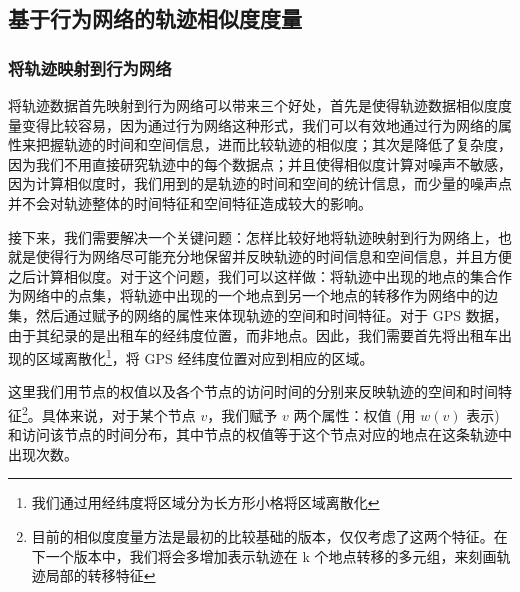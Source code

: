 \subsection{基于行为网络的轨迹相似度度量}
\subsubsection{将轨迹映射到行为网络}
\label{subsubsec:mapping}
将轨迹数据首先映射到行为网络可以带来三个好处，首先是使得轨迹数据相似度度量变得比较容易，因为通过行为网络这种形式，我们可以有效地通过行为网络的属性来把握轨迹的时间和空间信息，进而比较轨迹的相似度；其次是降低了复杂度，因为我们不用直接研究轨迹中的每个数据点；并且使得相似度计算对噪声不敏感，因为计算相似度时，我们用到的是轨迹的时间和空间的统计信息，而少量的噪声点并不会对轨迹整体的时间特征和空间特征造成较大的影响。\par
接下来，我们需要解决一个关键问题：怎样比较好地将轨迹映射到行为网络上，也就是使得行为网络尽可能充分地保留并反映轨迹的时间信息和空间信息，并且方便之后计算相似度。对于这个问题，我们可以这样做：将轨迹中出现的地点的集合作为网络中的点集，将轨迹中出现的一个地点到另一个地点的转移作为网络中的边集，然后通过赋予的网络的属性来体现轨迹的空间和时间特征。对于 GPS 数据，由于其纪录的是出租车的经纬度位置，而非地点。因此，我们需要首先将出租车出现的区域离散化\footnote{我们通过用经纬度将区域分为长方形小格将区域离散化}，将 GPS 经纬度位置对应到相应的区域。\par
这里我们用节点的权值以及各个节点的访问时间的分别来反映轨迹的空间和时间特征\footnote{目前的相似度度量方法是最初的比较基础的版本，仅仅考虑了这两个特征。在下一个版本中，我们将会多增加表示轨迹在 k 个地点转移的多元组，来刻画轨迹局部的转移特征}。具体来说，对于某个节点 $v$，我们赋予 $v$ 两个属性：权值 (用 $w(v)$ 表示) 和访问该节点的时间分布，其中节点的权值等于这个节点对应的地点在这条轨迹中出现次数。 \par
